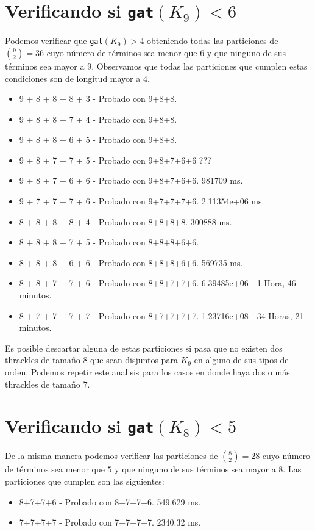 \documentclass[12pt, letterpaper]{article}
\begin{document}
\section{Verificando si \texttt{gat}$(K_9) < 6$}
Podemos verificar que \texttt{gat}$(K_9) > 4$ obteniendo todas las particiones de $\binom{9}{2} = 36$ cuyo
número de términos sea menor que $6$ y que ninguno de sus términos sea mayor a $9$.
Observamos que todas las particiones que cumplen estas condiciones son de longitud mayor a $4$.
\begin{itemize}
  \item 9 + 8 + 8 + 8 + 3 - Probado con 9+8+8.
  \item 9 + 8 + 8 + 7 + 4 - Probado con 9+8+8.
  \item 9 + 8 + 8 + 6 + 5 - Probado con 9+8+8.
  \item 9 + 8 + 7 + 7 + 5 - Probado con 9+8+7+6+6 ???
  \item 9 + 8 + 7 + 6 + 6 - Probado con 9+8+7+6+6. 981709 ms.
  \item 9 + 7 + 7 + 7 + 6 - Probado con 9+7+7+7+6. 2.11354e+06 ms.
  \item 8 + 8 + 8 + 8 + 4 - Probado con 8+8+8+8. 300888 ms.
  \item 8 + 8 + 8 + 7 + 5 - Probado con 8+8+8+6+6.
  \item 8 + 8 + 8 + 6 + 6 - Probado con 8+8+8+6+6. 569735 ms.
  \item 8 + 8 + 7 + 7 + 6 - Probado con 8+8+7+7+6. 6.39485e+06 - 1 Hora, 46 minutos.
  \item 8 + 7 + 7 + 7 + 7 - Probado con 8+7+7+7+7. 1.23716e+08 - 34 Horas, 21 minutos.
\end{itemize}

Es posible descartar alguna de estas particiones si pasa que no existen dos thrackles de tamaño $8$ que sean disjuntos
para $K_9$ en alguno de sus tipos de orden. Podemos repetir este analisis para los casos en donde haya dos o más thrackles
de tamaño $7$.

\section{Verificando si \texttt{gat}$(K_8) < 5$}
De la misma manera podemos verificar las particiones de $\binom{8}{2} = 28$ cuyo número de términos sea menor que $5$ y
que ninguno de sus términos sea mayor a $8$.
Las particiones que cumplen son las siguientes:
\begin{itemize}
  \item 8+7+7+6 - Probado con 8+7+7+6. 549.629 ms.
  \item 7+7+7+7 - Probado con 7+7+7+7. 2340.32 ms.
\end{itemize}
\end{document}

